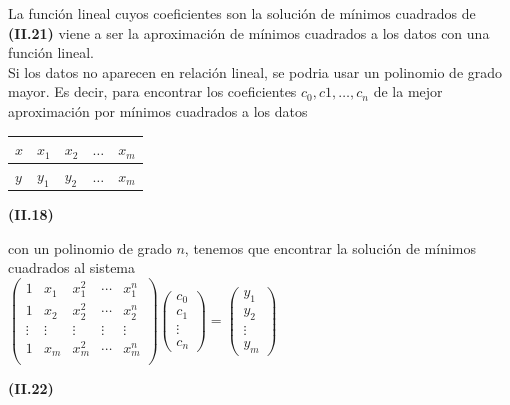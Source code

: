 \documentclass[twocolumn,twoside]{article}
\begin{document}
La funci\'on lineal cuyos coeficientes son la soluci\'on de m\'inimos cuadrados de \textbf{(II.21)}
viene a ser la aproximaci\'on de m\'inimos cuadrados a los datos con una funci\'on lineal. \\
Si los datos no aparecen en relaci\'on lineal, se podria usar un polinomio de grado
mayor. Es decir, para encontrar los coeficientes $c_{0}, c{1},\dots, c_{n}$ de la mejor aproximaci\'on
por m\'inimos cuadrados a los datos 
\begin{table}[!htb]
  \begin{center}
      
  
  \begin{tabular}{|l|l|l|l|l|}
  \hline
  
  $x$&   $x_{1}$&   $x_{2}$&   $\dots$&  $x_{m}$ \\ \hline
  $y$&   $y_{1}$&   $y_{2}$&   $\dots$&  $x_{m}$ \\ 
  \hline 
  \end{tabular}
  \hspace{1cm}\textbf{(II.18)}
  \end{center}
  \end{table} 

con un polinomio de grado $n$, tenemos que encontrar la soluci\'on de m\'inimos cuadrados
al sistema\vspace{0.1cm}\\
\small
$ 
\left(\begin{array}{ccccc}
  1 & x_1 &x_1^2 &\cdots &x_1^n\\ 
  1 & x_2 &x_2^2 &\cdots &x_2^n\\ 
  \vdots & \vdots &\vdots & \vdots &\vdots\\
  1 & x_m &x_m^2 &\cdots &x_m^n\\ 
 \end{array}\right) 
 \left(\begin{array}{c}
  c_0\\ 
  c_1\\
  \vdots\\
  c_n  
 \end{array}\right)=
 \left(\begin{array}{c}
  y_1\\ 
  y_2 \\
  \vdots \\
  y_m
 \end{array}\right)$
 \normalsize
 \begin{center}
   \textbf{(II.22)}
 \end{center}
 
\end{document}
